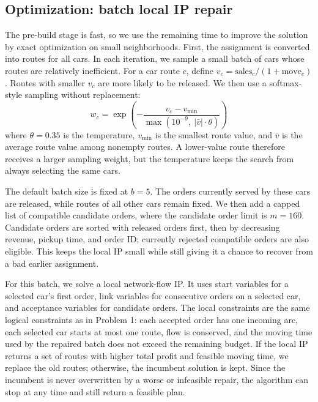\documentclass[10pt,a4paper]{article}
\begin{document}
\subsection*{Optimization: batch local IP repair}

The pre-build stage is fast, so we use the remaining time to improve the
solution by exact optimization on small neighborhoods.  First, the assignment is
converted into routes for all cars.  In each iteration, we sample a small batch
of cars whose routes are relatively inefficient.  For a car route $c$, define
$v_c=\text{sales}_c/(1+\text{move}_c)$.
Routes with smaller $v_c$ are more likely to be released. We then
use a softmax-style sampling without replacement:
\[w_c=\exp\!\left(-\frac{v_c-v_{\min}}{\max(10^{-9},\ |\bar v|\cdot \theta)}\right)\]
where $\theta=0.35$ is the temperature, $v_{\min}$ is the smallest route value,
and $\bar v$ is the average route value among nonempty routes.  A lower-value
route therefore receives a larger sampling weight, but the temperature keeps
the search from always selecting the same cars.

The default batch size is fixed at $b=5$. The orders currently served by these cars are released, while routes of all other cars remain fixed. We then add a capped list of compatible candidate orders, where the candidate order limit is $m = 160$. Candidate orders are sorted with
released orders first, then by decreasing revenue, pickup time, and order ID;
currently rejected compatible orders are also eligible.  This keeps the local IP
small while still giving it a chance to recover from a bad earlier assignment.

For this batch, we solve a local network-flow IP.  It uses start variables for a
selected car's first order, link variables for consecutive orders on a selected
car, and acceptance variables for candidate orders.  The local constraints are
the same logical constraints as in Problem 1: each accepted order has one
incoming arc, each selected car starts at most one route, flow is conserved, and
the moving time used by the repaired batch does not exceed the remaining budget.
If the local IP returns a set of routes with higher total profit and feasible
moving time, we replace the old routes; otherwise, the incumbent solution is
kept.  Since the incumbent is never overwritten by a worse or infeasible repair,
the algorithm can stop at any time and still return a feasible plan.
\end{document}
